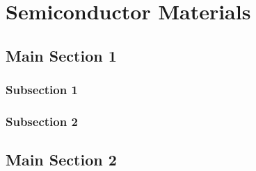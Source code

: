 
\chapter{Semiconductor Materials} %

\label{Chapter1} %



\section{Main Section 1}


\subsection{Subsection 1}



\subsection{Subsection 2}


\section{Main Section 2}

